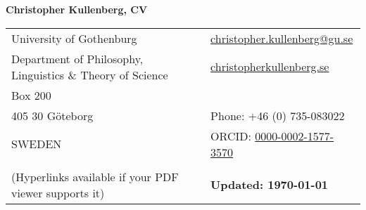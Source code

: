\documentclass[a4paper,11pt,oneside]{article}
\begin{document}

\noindent  \LARGE{\textbf{Christopher Kullenberg, CV}}  \\
\vspace{-2ex}
\hline
\normalsize

\begin{center}
\begin{tabular}{l l}
 University of Gothenburg    & \hspace{.5in} \href{mailto:christopher.kullenberg@gu.se}{christopher.kullenberg@gu.se} \\
 Department of Philosophy, Linguistics \& Theory of Science    & \hspace{.5in}  \href{http://christopherkullenberg.se}{christopherkullenberg.se}   \\
 Box 200             & \\
 405 30 Göteborg & \hspace{.5in} Phone: +46 (0) 735-083022 \\
 SWEDEN & \hspace{.5in} ORCID: \href{http://orcid.org/0000-0002-1577-3570}{0000-0002-1577-3570} \\
 \\ (Hyperlinks available if your PDF viewer supports it) & \hspace{.5in}  \textbf{Updated: \today} \\
\end{tabular}
\end{center}

\vspace{1em}

\end{document}
